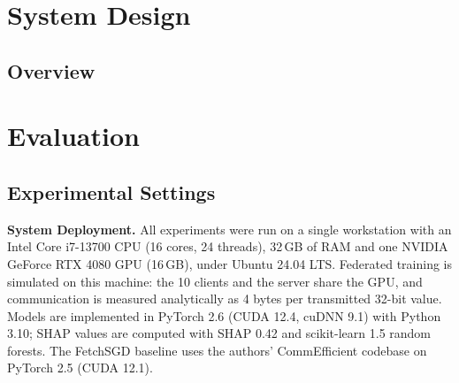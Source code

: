 \documentclass[sigconf]{acmart}
\begin{document}


\section{System Design}

\subsection{Overview}


\section{Evaluation}

\subsection{Experimental Settings}

\textbf{System Deployment.}
All experiments were run on a single workstation with an Intel Core i7-13700 CPU (16 cores, 24 threads), 32\,GB of RAM and one NVIDIA GeForce RTX 4080 GPU (16\,GB), under Ubuntu 24.04 LTS. Federated training is simulated on this machine: the 10 clients and the server share the GPU, and communication is measured analytically as 4 bytes per transmitted 32-bit value. Models are implemented in PyTorch 2.6 (CUDA 12.4, cuDNN 9.1) with Python 3.10; SHAP values are computed with SHAP 0.42 and scikit-learn 1.5 random forests. The FetchSGD baseline uses the authors' CommEfficient codebase on PyTorch 2.5 (CUDA 12.1).
\end{document}
